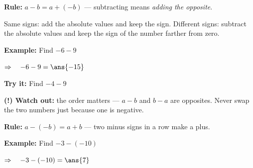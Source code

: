 \documentclass[12pt]{article}
\begin{document}


\begin{formulabox}
\textbf{Rule:} \quad $a - b = a + (-b)$ \quad --- subtracting means \emph{adding the opposite}.\par
Same signs: add the absolute values and keep the sign. Different signs: subtract the
absolute values and keep the sign of the number farther from zero.
\end{formulabox}

\begin{examplebox}
\textbf{Example:} \quad Find $-6 - 9$

$\Rightarrow\quad -6 - 9 = \ans{-15}$
\end{examplebox}

\begin{tryitbox}
\textbf{Try it:} \quad Find $-4 - 9$\\[2pt]
\end{tryitbox}

\begin{watchoutbox}
\textbf{(!) Watch out:} the order matters --- $a - b$ and $b - a$ are opposites.
Never swap the two numbers just because one is negative.
\end{watchoutbox}


\begin{formulabox}
\textbf{Rule:} \quad $a - (-b) = a + b$ \quad --- two minus signs in a row make a plus.
\end{formulabox}

\begin{examplebox}
\textbf{Example:} \quad Find $-3 - (-10)$

$\Rightarrow\quad -3 - (-10) = \ans{7}$
\end{examplebox}
\end{document}
